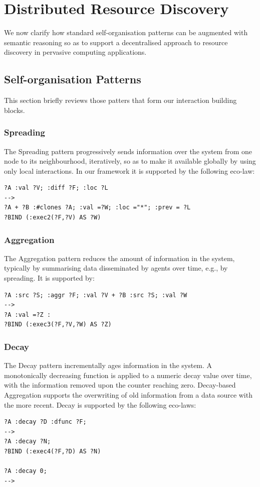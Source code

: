 \documentclass[12pt,a4paper,twoside,openright]{book}
\begin{document}
\section{Distributed Resource Discovery}
\label{sec:operational_framework}
We now clarify how standard self-organisation patterns can be augmented with semantic reasoning so as to support a decentralised approach to resource discovery in pervasive computing applications.

\subsection{Self-organisation Patterns}
This section briefly reviews those patters that form our interaction building blocks.

\subsubsection{Spreading}
The Spreading pattern progressively sends information over the system from one node to its neighbourhood, iteratively, so as to make it available globally by using only local interactions.
%
In our framework it is supported by the following eco-law:
%
\begin{Verbatim}[samepage=true, frame=single, commandchars=\\\{\}, label={\small \bf Spreading}]
?A :val ?V; :diff ?F; :loc ?L
--> 
?A + ?B :#clones ?A; :val =?W; :loc ="*"; :prev = ?L
?BIND (:exec2(?F,?V) AS ?W)
\end{Verbatim}

\subsubsection{Aggregation}
The Aggregation pattern reduces the amount of information in the system, typically by summarising data disseminated by agents over time, e.g., by spreading.
%
It is supported by:
%
\begin{Verbatim}[samepage=true, frame=single, commandchars=\\\{\}, label={\small \bf Aggregation}]
?A :src ?S; :aggr ?F; :val ?V + ?B :src ?S; :val ?W 
--> 
?A :val =?Z :
?BIND (:exec3(?F,?V,?W) AS ?Z)
\end{Verbatim}

\subsubsection{Decay}
The Decay pattern incrementally ages information in the system.
%
A monotonically decreasing function is applied to a numeric decay value over time, with the information removed upon the counter reaching zero.
%
Decay-based Aggregation supports the overwriting of old information from a data source with the more recent.
%
Decay is supported by the following eco-laws:
%
\begin{Verbatim}[samepage=true, frame=single, commandchars=\\\{\}, label={\small \bf Decay}]
?A :decay ?D :dfunc ?F;
--> 
?A :decay ?N;
?BIND (:exec4(?F,?D) AS ?N)

?A :decay 0;
--> 
\end{Verbatim}
\end{document}
